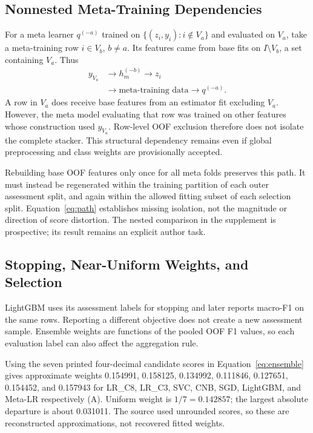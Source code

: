 \documentclass[doublecolumn]{ijcvsplatex}
\begin{document}
\subsection{Nonnested Meta-Training Dependencies}
For a meta learner $q^{(-a)}$ trained on $\{(z_i,y_i):i\notin V_a\}$ and evaluated on $V_a$, take a meta-training row $i\in V_b$, $b\ne a$. Its features came from base fits on $I\setminus V_b$, a set containing $V_a$. Thus
\begin{equation}
\begin{aligned}
y_{V_a}&\longrightarrow h_m^{(-b)}\longrightarrow z_i\\
&\longrightarrow\text{meta-training data}\longrightarrow q^{(-a)}.
\end{aligned}
\label{eq:path}
\end{equation}
A row in $V_a$ does receive base features from an estimator fit excluding $V_a$. However, the meta model evaluating that row was trained on other features whose construction used $y_{V_a}$. Row-level OOF exclusion therefore does not isolate the complete stacker. This structural dependency remains even if global preprocessing and class weights are provisionally accepted.

Rebuilding base OOF features only once for all meta folds preserves this path. It must instead be regenerated within the training partition of each outer assessment split, and again within the allowed fitting subset of each selection split. Equation~\ref{eq:path} establishes missing isolation, not the magnitude or direction of score distortion. The nested comparison in the supplement is prospective; its result remains an explicit author task.

\subsection{Stopping, Near-Uniform Weights, and Selection}
LightGBM uses its assessment labels for stopping and later reports macro-F1 on the same rows. Reporting a different objective does not create a new assessment sample. Ensemble weights are functions of the pooled OOF F1 values, so each evaluation label can also affect the aggregation rule.

Using the seven printed four-decimal candidate scores in Equation~\ref{eq:ensemble} gives approximate weights 0.154991, 0.158125, 0.134992, 0.111846, 0.127651, 0.154452, and 0.157943 for LR\_C8, LR\_C3, SVC, CNB, SGD, LightGBM, and Meta-LR respectively (A). Uniform weight is $1/7=0.142857$; the largest absolute departure is about 0.031011. The source used unrounded scores, so these are reconstructed approximations, not recovered fitted weights.
\end{document}
